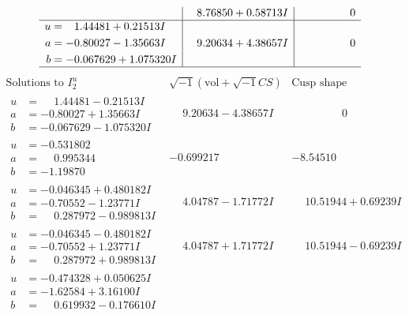 \documentclass[1p]{elsarticle_modified}
\theoremstyle{definition}
\newcommand{\I}{\sqrt{-1}}
\begin{document}
$$\begin{array}{c|c|c}
 & \phantom{-}8.76850 + 0.58713 I & \phantom{-0.000000 } 0 \\ \hline\begin{aligned}
u &= \phantom{-}1.44481 + 0.21513 I \\
a &= -0.80027 - 1.35663 I \\
b &= -0.067629 + 1.075320 I\end{aligned}
 & \phantom{-}9.20634 + 4.38657 I & \phantom{-0.000000 } 0\\
 \hline 
 \end{array}$$\newpage$$\begin{array}{c|c|c}  
\text{Solutions to }I^u_{2}& \I (\text{vol} + \sqrt{-1}CS) & \text{Cusp shape}\\
 \hline 
\begin{aligned}
u &= \phantom{-}1.44481 - 0.21513 I \\
a &= -0.80027 + 1.35663 I \\
b &= -0.067629 - 1.075320 I\end{aligned}
 & \phantom{-}9.20634 - 4.38657 I & \phantom{-0.000000 } 0 \\ \hline\begin{aligned}
u &= -0.531802\phantom{ +0.000000I} \\
a &= \phantom{-}0.995344\phantom{ +0.000000I} \\
b &= -1.19870\phantom{ +0.000000I}\end{aligned}
 & -0.699217\phantom{ +0.000000I} & -8.54510\phantom{ +0.000000I} \\ \hline\begin{aligned}
u &= -0.046345 + 0.480182 I \\
a &= -0.70552 - 1.23771 I \\
b &= \phantom{-}0.287972 - 0.989813 I\end{aligned}
 & \phantom{-}4.04787 - 1.71772 I & \phantom{-}10.51944 + 0.69239 I \\ \hline\begin{aligned}
u &= -0.046345 - 0.480182 I \\
a &= -0.70552 + 1.23771 I \\
b &= \phantom{-}0.287972 + 0.989813 I\end{aligned}
 & \phantom{-}4.04787 + 1.71772 I & \phantom{-}10.51944 - 0.69239 I \\ \hline\begin{aligned}
u &= -0.474328 + 0.050625 I \\
a &= -1.62584 + 3.16100 I \\
b &= \phantom{-}0.619932 - 0.176610 I\end{aligned}

\end{array}$$
\end{document}

